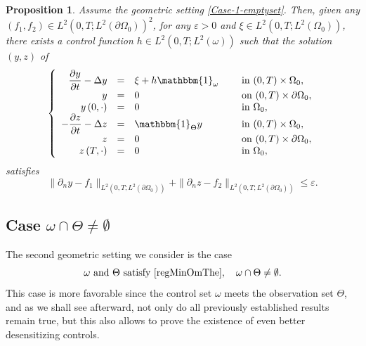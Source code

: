 \documentclass[10pt,a4paper]{amsart}
\newtheorem{proposition}[theorem]{Proposition}
\theoremstyle{definition}
\begin{document}
\begin{proposition}
\label{Prop-Approx-Cont-Case1}
Assume the geometric setting \eqref{Case-1-emptyset}. Then, given any $(f_1, f_2) \in L^2(0,T; L^2(\partial \Omega_0))^2$, for any $\varepsilon >0$ and $\xi \in L^2(0,T; L^2(\Omega_0))$, there exists a control function $h \in L^2(0,T; L^2(\omega))$ such that the solution $(y,z)$ of
\begin{equation}
\label{Coupled-Heat-Approx}
\left\{
\begin{array}{rcll}
\dfrac{\partial y}{\partial t}-\Delta y &=&\xi +h\mathbbm{1}_{\omega}\quad&\text{ in }(0,T) \times \Omega_0,
\\
y &=& 0 &\text{ on }(0,T) \times \partial \Omega_0,
\\
y\left(0,\cdot\right) &=& 0 &\text{ in }\Omega_0,
\\
-\dfrac{\partial z}{\partial t}-\Delta z &=&\mathbbm{1}_{\Theta}y &\text{ in }(0,T) \times \Omega_0,
\\
z &=& 0 &\text{ on }(0,T) \times \partial \Omega_0,
\\
z\left(T,\cdot\right) &=& 0 &\text{ in }\Omega_0,
\end{array}
\right.
\end{equation}
satisfies
\begin{equation}
\label{Approx-Cont}
\| \partial_n y - f_1 \|_{L^2(0,T; L^2(\partial\Omega_0))}
+
\| \partial_n z - f_2 \|_{L^2(0,T; L^2(\partial\Omega_0))}
\leq
\varepsilon.
\end{equation}
\end{proposition}

\subsection*{Case \texorpdfstring{$\omega \cap \Theta \neq \emptyset$}{caseO}}
The second geometric setting we consider is the case
\begin{equation}
\label{Case-2-non-emptyset}
\omega\text{ and }\Theta\text{ satisfy }\eqref{regMinOmThe},\quad \omega \cap \Theta \neq \emptyset.
\end{equation}
This case is more favorable since the control set $\omega$ meets the observation set $\Theta$, and as we shall see afterward, not only do all previously established results remain true, but this also allows to prove the existence of even better desensitizing controls.
\end{document}
